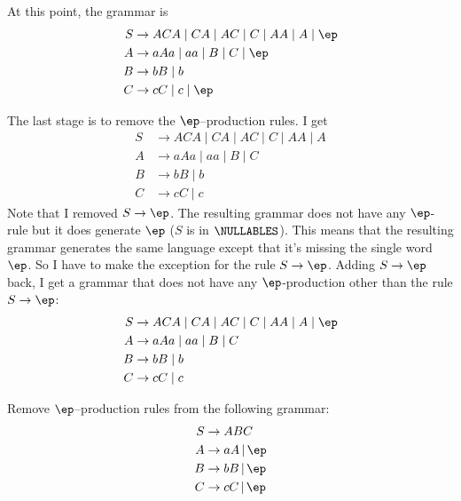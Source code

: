 At this point, the grammar is 
\begin{align*}
  S &\rightarrow ACA 
    \mid CA
    \mid AC 
    \mid C 
    \mid AA 
    \mid A
    \mid \ep
    \\
    A &\rightarrow aAa \mid aa \mid B \mid C \mid \ep \\
    B &\rightarrow bB \mid b \\
    C &\rightarrow cC \mid c \mid \ep
  \end{align*}

The last stage is to remove the $\ep$--production rules.
I get
\begin{align*}
  S &\rightarrow ACA 
    \mid CA
    \mid AC 
    \mid C 
    \mid AA 
    \mid A
    \\
    A &\rightarrow aAa \mid aa \mid B \mid C \\
    B &\rightarrow bB \mid b \\
    C &\rightarrow cC \mid c 
  \end{align*}
Note that I removed $S \rightarrow \ep$.
The resulting grammar does not have any $\ep$-rule but it does generate
$\ep$ ($S$ is in $\NULLABLES$).
This means that the resulting grammar
generates the same language except that it's missing the 
single word $\ep$.
So I have to make the exception for the rule $S \rightarrow \ep$.
Adding $S \rightarrow \ep$ back, I get a grammar that does not have
any $\ep$-production other than the rule $S \rightarrow \ep$:
\begin{align*}
  S &\rightarrow ACA 
    \mid CA
    \mid AC 
    \mid C 
    \mid AA 
    \mid A \mid \ep
    \\
    A &\rightarrow aAa \mid aa \mid B \mid C \\
    B &\rightarrow bB \mid b \\
    C &\rightarrow cC \mid c 
  \end{align*}

\newpage
\begin{eg} Remove $\ep$--production rules from the following grammar:
  \begin{align*}
    S &\rightarrow ABC \\
    A &\rightarrow aA \,|\, \ep \\
    B &\rightarrow bB \,|\, \ep \\
    C &\rightarrow cC \,|\, \ep \\
  \end{align*}

\end{eg}




